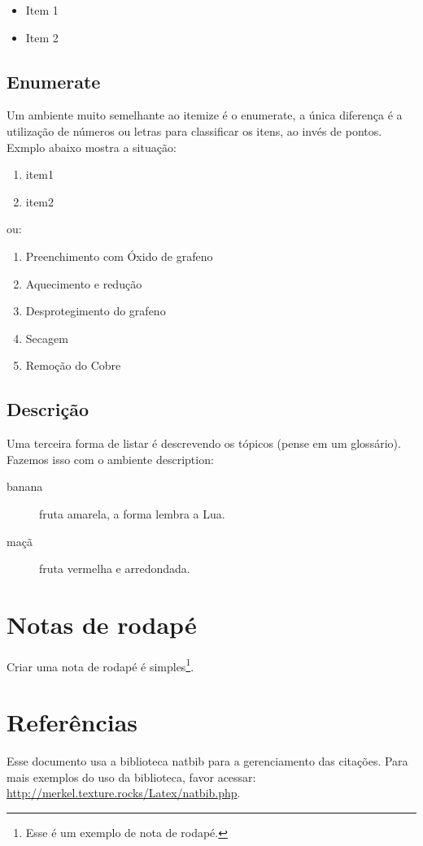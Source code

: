 \begin{itemize}
	\item Item 1
	\item Item 2
\end{itemize}

\subsection{Enumerate}
Um ambiente muito semelhante ao itemize é o enumerate, a única diferença é a utilização de números ou letras para classificar os itens, ao invés de pontos. Exmplo abaixo mostra a situação:

\begin{enumerate}
   \item item1
   \item item2
 \end{enumerate}

ou:

\begin{enumerate}[a]
	\item Preenchimento com \'Oxido de grafeno
	\item Aquecimento e redu\c{c}\~ao
	\item Desprotegimento do grafeno
	\item Secagem
	\item Remo\c{c}\~ao do Cobre
\end{enumerate}

\subsection{Descrição}
Uma terceira forma de listar é descrevendo os tópicos (pense em um glossário). Fazemos isso com o ambiente description:
\begin{description}
	\item[banana] fruta amarela, a forma lembra a Lua.
	\item[maçã] fruta vermelha e arredondada.
\end{description}

\section{Notas de rodapé} \label{sec:Cap1-rodape}

Criar uma nota de rodapé é simples\footnote{Esse é um exemplo de nota de rodapé.}.

\section{Referências} \label{sec:Cap1-Secao5}
Esse documento usa a biblioteca natbib para a gerenciamento das citações. Para mais exemplos do uso da biblioteca, favor acessar: \url{http://merkel.texture.rocks/Latex/natbib.php}.
